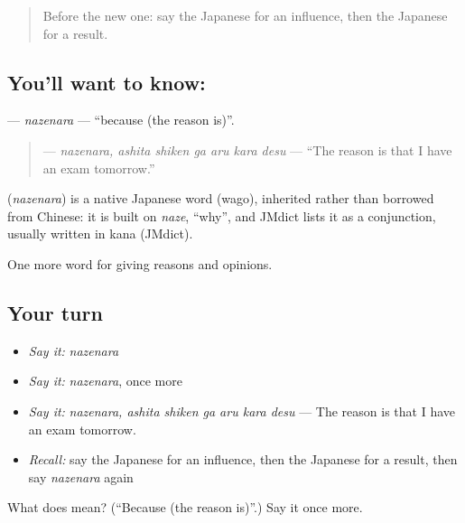 \begin{quote}
Before the new one: say the Japanese for an influence, then the Japanese for a result.
\end{quote}

\subsection*{You'll want to know: }
\textbf{} — \emph{nazenara} — \textquotedblleft{}because (the reason is)\textquotedblright{}.

\begin{quote}
\textbf{  } — \emph{nazenara, ashita shiken ga aru kara desu} — \textquotedblleft{}The reason is that I have an exam tomorrow.\textquotedblright{}
\end{quote}

\begin{cousinweb}
\textbf{} (\emph{nazenara}) is a native Japanese word (wago), inherited rather than borrowed from Chinese: it is built on \emph{naze}, \textquotedblleft{}why\textquotedblright{}, and JMdict lists it as a conjunction, usually written in kana (JMdict).
\end{cousinweb}

\begin{grammarlens}[title={What you've built}]
One more word for giving reasons and opinions.
\end{grammarlens}

\subsection*{Your turn}
\begin{itemize}
\raggedright
  \item \emph{Say it:} \emph{nazenara}
  \item \emph{Say it:} \emph{nazenara}, once more
  \item \emph{Say it:} \emph{nazenara, ashita shiken ga aru kara desu} — The reason is that I have an exam tomorrow.
  \item \emph{Recall:} say the Japanese for an influence, then the Japanese for a result, then say \emph{nazenara} again
\end{itemize}

\begin{tcolorbox}[breakable,colback=teal!4,colframe=teal!35!black,title={Before you move on}]
What does  mean? (\textquotedblleft{}Because (the reason is)\textquotedblright{}.) Say it once more.
\end{tcolorbox}
